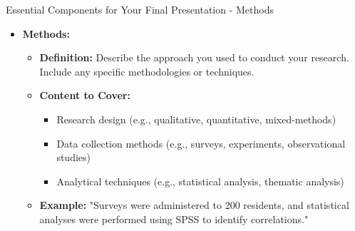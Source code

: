 \documentclass[aspectratio=169]{beamer}
\begin{document}
\begin{frame}[fragile]{Essential Components for Your Final Presentation - Methods}
    \begin{itemize}
        \item \textbf{Methods:}
        \begin{itemize}
            \item \textbf{Definition:} Describe the approach you used to conduct your research. Include any specific methodologies or techniques.
            \item \textbf{Content to Cover:} 
            \begin{itemize}
                \item Research design (e.g., qualitative, quantitative, mixed-methods)
                \item Data collection methods (e.g., surveys, experiments, observational studies)
                \item Analytical techniques (e.g., statistical analysis, thematic analysis)
            \end{itemize}
            \item \textbf{Example:} "Surveys were administered to 200 residents, and statistical analyses were performed using SPSS to identify correlations."
        \end{itemize}
    \end{itemize}
\end{frame}
\end{document}
